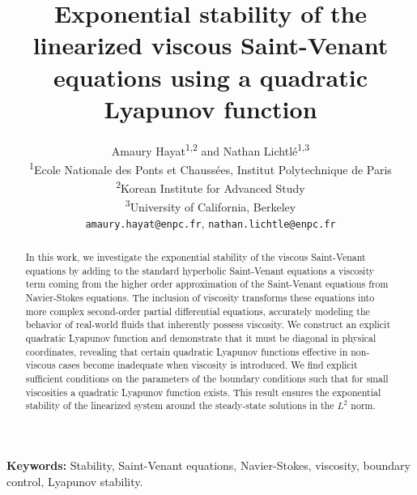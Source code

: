 \documentclass[11pt]{article}
\begin{document}
\title{Exponential stability of the {linearized} viscous Saint-Venant equations using a quadratic Lyapunov function}

\author{
Amaury Hayat\textsuperscript{1,2} and Nathan Lichtlé\textsuperscript{1,3}\\[0.5em]
\small \textsuperscript{1}Ecole Nationale des Ponts et Chaussées, Institut Polytechnique de Paris\\
\small \textsuperscript{2}Korean Institute for Advanced Study\\
\small \textsuperscript{3}University of California, Berkeley\\
\small \texttt{amaury.hayat@enpc.fr}, \texttt{nathan.lichtle@enpc.fr}
}
\date{}

\maketitle 

\begingroup
\renewcommand\thefootnote{}
\addtocounter{footnote}{-1}
\endgroup

\begin{abstract}

In this work, we investigate the exponential stability of the viscous Saint-Venant equations by adding to the standard hyperbolic Saint-Venant equations a viscosity term coming from the higher order approximation of the Saint-Venant equations from Navier-Stokes equations. The inclusion of viscosity transforms these equations into more complex second-order partial differential equations, accurately modeling the behavior of real-world fluids that inherently possess viscosity. We construct an explicit quadratic Lyapunov function and demonstrate that it must be diagonal in physical coordinates, revealing that certain quadratic Lyapunov functions effective in non-viscous cases become inadequate when viscosity is introduced. {We find explicit sufficient conditions on the parameters of the boundary conditions} such that for small viscosities a quadratic Lyapunov function exists. This result ensures the exponential stability of the linearized system around the steady-state solutions in the $L^2$ norm. 

\end{abstract}

\noindent\textbf{Keywords:} Stability, Saint-Venant equations, Navier-Stokes, viscosity, boundary control, Lyapunov stability.
\end{document}
